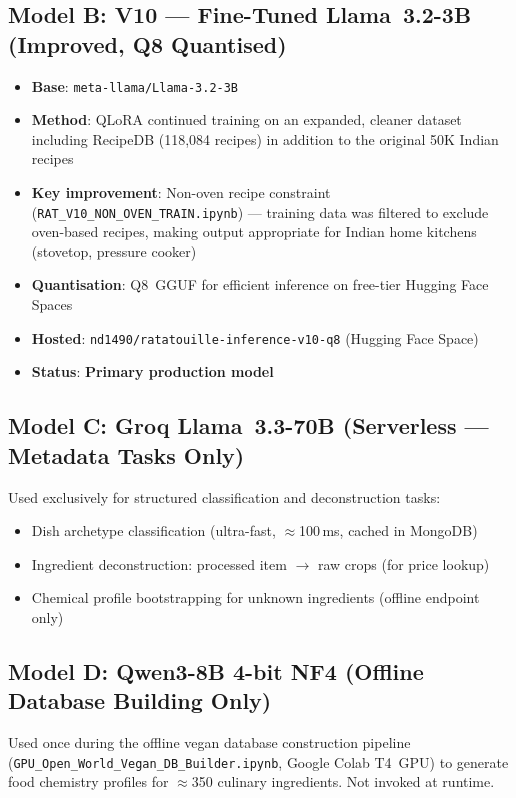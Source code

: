 \documentclass[12pt, a4paper]{article}
\begin{document}
\subsection{Model B: V10 --- Fine-Tuned Llama~3.2-3B (Improved, Q8 Quantised)}

\begin{itemize}
  \item \textbf{Base}: \texttt{meta-llama/Llama-3.2-3B}
  \item \textbf{Method}: QLoRA continued training on an expanded, cleaner dataset including RecipeDB (118,084 recipes) in addition to the original 50K Indian recipes
  \item \textbf{Key improvement}: Non-oven recipe constraint (\texttt{RAT\_V10\_\allowbreak NON\_OVEN\_TRAIN.ipynb}) --- training data was filtered to exclude oven-based recipes, making output appropriate for Indian home kitchens (stovetop, pressure cooker)
  \item \textbf{Quantisation}: Q8~GGUF for efficient inference on free-tier Hugging Face Spaces
  \item \textbf{Hosted}: \texttt{nd1490/ratatouille-inference-v10-q8} (Hugging Face Space)
  \item \textbf{Status}: \textbf{Primary production model}
\end{itemize}

\subsection{Model C: Groq Llama~3.3-70B (Serverless --- Metadata Tasks Only)}

Used exclusively for structured classification and deconstruction tasks:
\begin{itemize}
  \item Dish archetype classification (ultra-fast, $\approx$100\,ms, cached in MongoDB)
  \item Ingredient deconstruction: processed item $\rightarrow$ raw crops (for price lookup)
  \item Chemical profile bootstrapping for unknown ingredients (offline endpoint only)
\end{itemize}

\subsection{Model D: Qwen3-8B 4-bit NF4 (Offline Database Building Only)}

Used once during the offline vegan database construction pipeline
(\texttt{GPU\_Open\_World\_\allowbreak Vegan\_DB\_Builder.ipynb}, Google Colab T4~GPU) to generate food
chemistry profiles for $\approx$350 culinary ingredients.  Not invoked at runtime.
\end{document}
